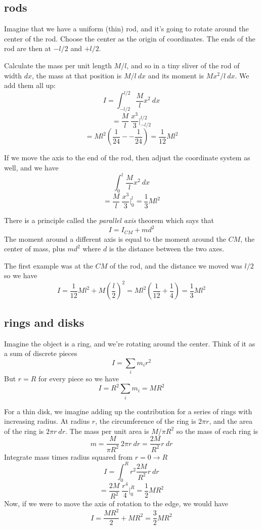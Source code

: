 \documentclass[11pt, oneside]{article}
\begin{document}
\subsection*{rods}
Imagine that we have a uniform (thin) rod, and it's going to rotate around the center of the rod.  Choose the center as the origin of coordinates.  The ends of the rod are then at $-l/2$ and $+l/2$.

Calculate the mass per unit length $M/l$, and so in a tiny sliver of the rod of width $dx$, the mass at that position is $M/l \ dx$ and its moment is $Mx^2/l \ dx$.  We add them all up:
\[ I = \int_{-l/2}^{l/2} \frac{M}{l} x^2 \ dx \]
\[ =  \frac{M}{l} \ \frac{x^3}{3} \bigg |_{-l/2}^{l/2} \]
\[ = Ml^2 (\frac{1}{24} - - \frac{1}{24}) = \frac{1}{12} Ml^2 \]

If we move the axis to the end of the rod, then adjust the coordinate system as well, and we have
\[ \int_0^l \frac{M}{l} x^2 \ dx \]
\[ =  \frac{M}{l} \ \frac{x^3}{3} \bigg |_{0}^{l} = \frac{1}{3} Ml^2 \]  

There is a principle called the \emph{parallel axis} theorem which says that 
\[ I = I_{CM} + md^2 \]
The moment around a different axis is equal to the moment around the $CM$, the center of mass, plus $md^2$ where $d$ is the distance between the two axes.  

The first example was at the $CM$ of the rod, and the distance we moved was $l/2$ so we have
\[ I = \frac{1}{12} Ml^2 + M (\frac{l}{2})^2 = Ml^2 (\frac{1}{12} + \frac{1}{4}) = \frac{1}{3} Ml^2 \]

\subsection*{rings and disks}
Imagine the object is a ring, and we're rotating around the center.  Think of it as a sum of discrete pieces
\[ I = \sum_i m_i r^2 \]
But $r = R$ for every piece so we have
\[ I = R^2 \sum_i m_i = MR^2 \]

For a thin disk, we imagine adding up the contribution for a series of rings with increasing radius.  At radius $r$, the circumference of the ring is $2 \pi r$, and the area of the ring is $2 \pi r \ dr$.  The mass per unit area is $M/\pi R^2$ so the mass of each ring is
\[ m = \frac{M}{\pi R^2} \ 2 \pi r \ dr = \frac{2M}{R^2} r \ dr \]
Integrate mass times radius squared from $r=0 \rightarrow R$
\[ I = \int_0^R r^2 \frac{2M}{R^2} r \ dr \]
\[ = \frac{2M}{R^2} \ \frac{r^4}{4} \bigg |_{0}^{R} =  \frac{1}{2} MR^2 \]
Now, if we were to move the axis of rotation to the edge, we would have
\[ I = \frac{MR^2}{2} + MR^2 = \frac{3}{2} MR^2 \]
\end{document}

